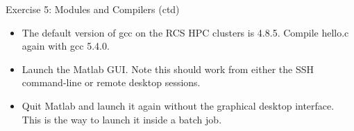 \documentclass{beamer}
\begin{document}
\begin{frame}{Exercise 5: Modules and Compilers (ctd)}
  \begin{itemize}
  \item{The default version of gcc on the RCS HPC clusters is 4.8.5. Compile hello.c again with \alert{gcc 5.4.0}.}
\item{Launch the Matlab GUI. Note this should work from either the SSH command-line or remote desktop sessions.}
\item{Quit Matlab and launch it again without the graphical desktop interface. This is the way to launch it inside a batch job.}
\end{itemize}
\end{frame}
\end{document}
